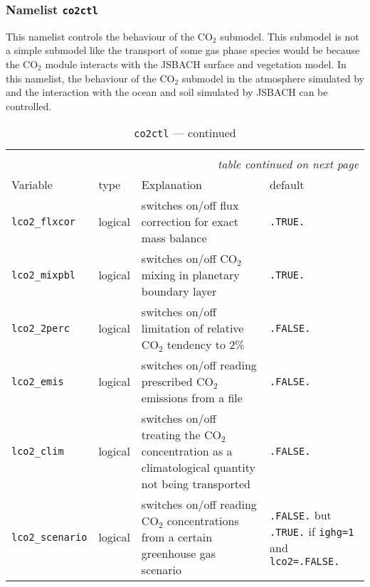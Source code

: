 \subsubsection{Namelist {\tt co2ctl}}\label{secco2ctl}

This namelist controls the behaviour of the CO$_2$ submodel. This
submodel is not a simple submodel like the transport of some gas phase
species would be because the CO$_2$ module interacts with the JSBACH
surface and vegetation model. In this namelist, the behaviour of the
CO$_2$ submodel in the atmosphere simulated by \echam{} and the
interaction with the ocean and soil simulated by JSBACH can be controlled.


\setlength{\LTcapwidth}{\textwidth}
\setlength{\LTleft}{0pt}\setlength{\LTright}{0pt}

\begin{longtable}{l@{\extracolsep\fill}lp{5.0cm}p{3.0cm}}
\hline\hline\caption[Namelist {\tt co2ctl}]{Namelist
  {\tt co2ctl}}\\\hline\label{tabco2ctl}
\endfirsthead
\caption[]{{\tt co2ctl} --- continued}\\\hline
\endhead
\hline\multicolumn{4}{r}{\slshape table continued on next page}\\
\endfoot
\hline %
\endlastfoot
Variable & type & Explanation & default \\\hline
{\tt lco2\_flxcor}\index{namelist variables!lco2\_flxcor} 
& logical & switches on/off flux correction for
  exact mass balance & {\tt .TRUE.} \\
{\tt lco2\_mixpbl}\index{namelist variables!lco2\_mixpbl}
 & logical & switches on/off CO$_2$ mixing in
  planetary boundary layer & {\tt .TRUE.} \\
{\tt lco2\_2perc}\index{namelist variables!lco2\_2perc} 
& logical & switches on/off limitation of relative CO$_2$
  tendency to 2\% & {\tt .FALSE.} \\
{\tt lco2\_emis}\index{namelist variables!lco2\_emis} 
& logical & switches on/off reading prescribed CO$_2$
  emissions from a file & {\tt .FALSE.} \\
{\tt lco2\_clim}\index{namelist variables!lco2\_clim} 
& logical & switches on/off treating the CO$_2$
  concentration as a climatological quantity not being transported
  & {\tt .FALSE.} \\
{\tt lco2\_scenario}\index{namelist variables!lco2\_scenario} 
& logical & switches on/off reading CO$_2$
  concentrations from a certain greenhouse gas scenario
  & {\tt .FALSE.} but {\tt .TRUE.} if {\tt ighg=1} and {\tt lco2=.FALSE.}\\

\hline 
\end{longtable}


